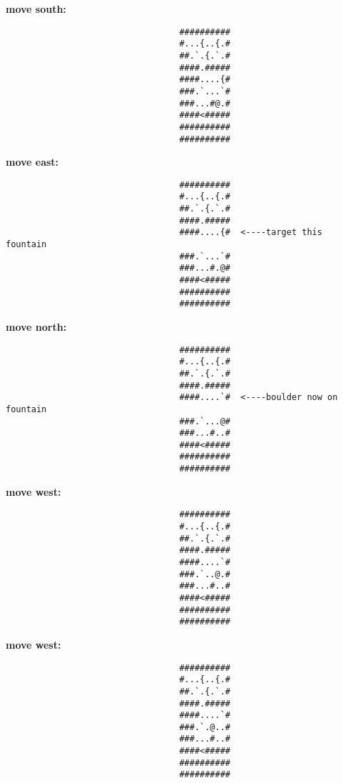 \begin{MyGreenBox}
{	\textbf{move south:} \begin{verbatim}
                                  ##########
                                  #...{..{.#
                                  ##.`.{.`.#
                                  ####.#####
                                  ####....{#
                                  ###.`...`#
                                  ###...#@.#
                                  ####<#####
                                  ##########
                                  ##########
\end{verbatim}

	\textbf{move east:} \begin{verbatim}
                                  ##########
                                  #...{..{.#
                                  ##.`.{.`.#
                                  ####.#####
                                  ####....{#  <----target this fountain
                                  ###.`...`#
                                  ###...#.@#
                                  ####<#####
                                  ##########
                                  ##########
\end{verbatim}

	\textbf{move north:} \begin{verbatim}
                                  ##########
                                  #...{..{.#
                                  ##.`.{.`.#
                                  ####.#####
                                  ####....`#  <----boulder now on fountain
                                  ###.`...@#
                                  ###...#..#
                                  ####<#####
                                  ##########
                                  ##########
\end{verbatim}

	\textbf{move west:} \begin{verbatim}
                                  ##########
                                  #...{..{.#
                                  ##.`.{.`.#
                                  ####.#####
                                  ####....`#
                                  ###.`..@.#
                                  ###...#..#
                                  ####<#####
                                  ##########
                                  ##########
\end{verbatim}

	\textbf{move west:} \begin{verbatim}
                                  ##########
                                  #...{..{.#
                                  ##.`.{.`.#
                                  ####.#####
                                  ####....`#
                                  ###.`.@..#
                                  ###...#..#
                                  ####<#####
                                  ##########
                                  ##########
\end{verbatim}

}
\end{MyGreenBox}
